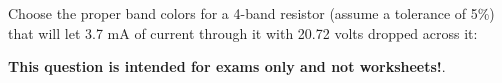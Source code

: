 

Choose the proper band colors for a 4-band resistor (assume a tolerance of 5\%) that will let 3.7 mA of current through it with 20.72 volts dropped across it:

\vskip 10pt

\underbar{\hskip 30pt} \hskip 30pt  \underbar{\hskip 30pt} \hskip 30pt  \underbar{\hskip 30pt} \hskip 30pt \underbar{\hskip 30pt}







 \hskip 30pt   \hskip 30pt   \hskip 30pt 







{\bf This question is intended for exams only and not worksheets!}.



